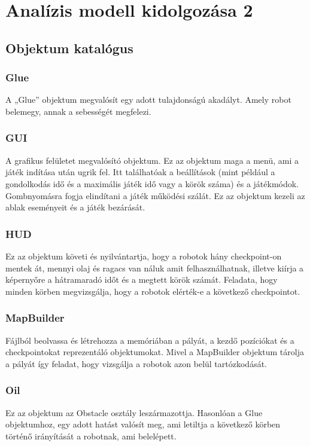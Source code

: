 %
\chapter{Analízis modell kidolgozása 2}

\thispagestyle{fancy}

\section{Objektum katalógus}

\subsection{Glue}
A „Glue” objektum megvalósít egy adott tulajdonságú akadályt. Amely robot belemegy, annak a sebességét megfelezi. 
\subsection{GUI}
A grafikus felületet megvalósító objektum. Ez az objektum maga a menü, ami a játék indítása után ugrik fel. Itt találhatóak a beállítások (mint például a gondolkodás idő és a maximális játék idő vagy a körök száma) és a játékmódok. Gombnyomásra fogja elindítani a játék működési szálát. Ez az objektum kezeli az ablak eseményeit és a játék bezárását.
\subsection{HUD}
Ez az objektum követi és nyilvántartja, hogy a robotok hány checkpoint-on mentek át, mennyi olaj és ragacs van náluk amit felhasználhatnak, illetve kiírja a képernyőre a hátramaradó időt és a megtett körök számát. Feladata, hogy minden körben megvizsgálja, hogy a robotok elérték-e a következő checkpointot.
\subsection{MapBuilder}
Fájlból beolvassa és létrehozza a memóriában a pályát, a kezdő pozíciókat és a checkpointokat reprezentáló objektumokat.  Mivel a  MapBuilder objektum tárolja a pályát így feladat, hogy vizsgálja a robotok azon belül tartózkodását.  
\subsection{Oil}
Ez az objektum az Obstacle osztály leszármazottja. Hasonlóan a Glue objektumhoz, egy adott hatást valósít meg, ami letiltja a következő körben történő irányítását a robotnak, ami belelépett.
